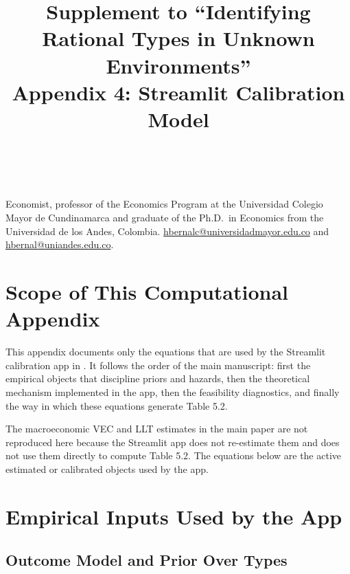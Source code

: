 \documentclass[ecta,nameyear,final,supplement]{econsocart}
\numberwithin{equation}{section}
\begin{document}
\begin{frontmatter}
\title{Supplement to ``Identifying Rational Types in Unknown Environments''\\
Appendix 4: Streamlit Calibration Model}

\begin{aug}
\author[add1,add2]{~}
\address[add1]{%
,
}
\address[add2]{%
,
}
\end{aug}

\begin{funding}
Economist, professor of the Economics Program at the Universidad Colegio
Mayor de Cundinamarca and graduate of the Ph.D.\ in Economics from the
Universidad de los Andes, Colombia.
\href{mailto:hbernalc@universidadmayor.edu.co}{hbernalc@universidadmayor.edu.co}
and \href{mailto:hbernal@uniandes.edu.co}{hbernal@uniandes.edu.co}.
\end{funding}

\end{frontmatter}

\section{Scope of This Computational Appendix}

This appendix documents only the equations that are used by the Streamlit
calibration app in . It follows the order of the main
manuscript: first the empirical objects that discipline priors and hazards,
then the theoretical mechanism implemented in the app, then the feasibility
diagnostics, and finally the way in which these equations generate Table 5.2.

The macroeconomic VEC and LLT estimates in the main paper are not reproduced
here because the Streamlit app does not re-estimate them and does not use them
directly to compute Table 5.2. The equations below are the active estimated or
calibrated objects used by the app.

\section{Empirical Inputs Used by the App}

\subsection{Outcome Model and Prior Over Types}
\end{document}
